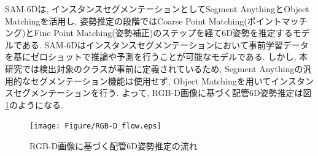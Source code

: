 SAM-6Dは, インスタンスセグメンテーションとしてSegment AnythingとObject Matchingを活用し, 姿勢推定の段階ではCoarse Point Matching(ポイントマッチング)とFine Point Matching(姿勢補正)のステップを経て6D姿勢を推定するモデルである. 
SAM-6Dはインスタンスセグメンテーションにおいて事前学習データを基にゼロショットで推論や予測を行うことが可能なモデルである. 
しかし, 本研究では検出対象のクラスが事前に定義されているため, Segment Anythingの汎用的なセグメンテーション機能は使用せず, Object Matchingを用いてインスタンスセグメンテーションを行う. 
よって, RGB-D画像に基づく配管6D姿勢推定は図\ref{fig:2-f8}のようになる. 
\begin{figure}[htbt]
	\centering
	 \texttt{[image: Figure/RGB-D\_flow.eps]}
	 \caption{RGB-D画像に基づく配管6D姿勢推定の流れ}
	 \label{fig:2-f8}
\end{figure}

